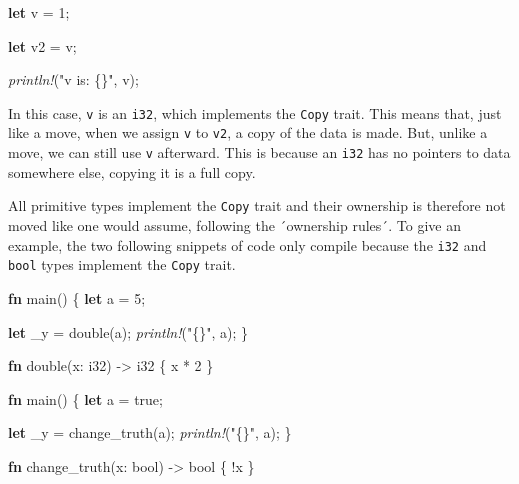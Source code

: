 \documentclass[a4paper,]{book}
\newenvironment{Shaded}{\begin{snugshade}}{\end{snugshade}}
\newcommand{\KeywordTok}[1]{\textcolor[rgb]{0.13,0.29,0.53}{\textbf{{#1}}}}
\newcommand{\DataTypeTok}[1]{\textcolor[rgb]{0.13,0.29,0.53}{{#1}}}
\newcommand{\DecValTok}[1]{\textcolor[rgb]{0.00,0.00,0.81}{{#1}}}
\newcommand{\ConstantTok}[1]{\textcolor[rgb]{0.00,0.00,0.00}{{#1}}}
\newcommand{\StringTok}[1]{\textcolor[rgb]{0.31,0.60,0.02}{{#1}}}
\newcommand{\PreprocessorTok}[1]{\textcolor[rgb]{0.56,0.35,0.01}{\textit{{#1}}}}
\newcommand{\NormalTok}[1]{{#1}}
\begin{document}
\begin{Shaded}
\begin{Highlighting}[]
\KeywordTok{let} \NormalTok{v = }\DecValTok{1}\NormalTok{;}

\KeywordTok{let} \NormalTok{v2 = v;}

\PreprocessorTok{println!}\NormalTok{(}\StringTok{"v is: \{\}"}\NormalTok{, v);}
\end{Highlighting}
\end{Shaded}

In this case, \texttt{v} is an \texttt{i32}, which implements the
\texttt{Copy} trait. This means that, just like a move, when we assign
\texttt{v} to \texttt{v2}, a copy of the data is made. But, unlike a
move, we can still use \texttt{v} afterward. This is because an
\texttt{i32} has no pointers to data somewhere else, copying it is a
full copy.

All primitive types implement the \texttt{Copy} trait and their
ownership is therefore not moved like one would assume, following the
´ownership rules´. To give an example, the two following snippets of
code only compile because the \texttt{i32} and \texttt{bool} types
implement the \texttt{Copy} trait.

\begin{Shaded}
\begin{Highlighting}[]
\KeywordTok{fn} \NormalTok{main() \{}
    \KeywordTok{let} \NormalTok{a = }\DecValTok{5}\NormalTok{;}

    \KeywordTok{let} \NormalTok{_y = double(a);}
    \PreprocessorTok{println!}\NormalTok{(}\StringTok{"\{\}"}\NormalTok{, a);}
\NormalTok{\}}

\KeywordTok{fn} \NormalTok{double(x: }\DataTypeTok{i32}\NormalTok{) -> }\DataTypeTok{i32} \NormalTok{\{}
    \NormalTok{x * }\DecValTok{2}
\NormalTok{\}}
\end{Highlighting}
\end{Shaded}

\begin{Shaded}
\begin{Highlighting}[]
\KeywordTok{fn} \NormalTok{main() \{}
    \KeywordTok{let} \NormalTok{a = }\ConstantTok{true}\NormalTok{;}

    \KeywordTok{let} \NormalTok{_y = change_truth(a);}
    \PreprocessorTok{println!}\NormalTok{(}\StringTok{"\{\}"}\NormalTok{, a);}
\NormalTok{\}}

\KeywordTok{fn} \NormalTok{change_truth(x: }\DataTypeTok{bool}\NormalTok{) -> }\DataTypeTok{bool} \NormalTok{\{}
    \NormalTok{!x}
\NormalTok{\}}
\end{Highlighting}
\end{Shaded}
\end{document}
